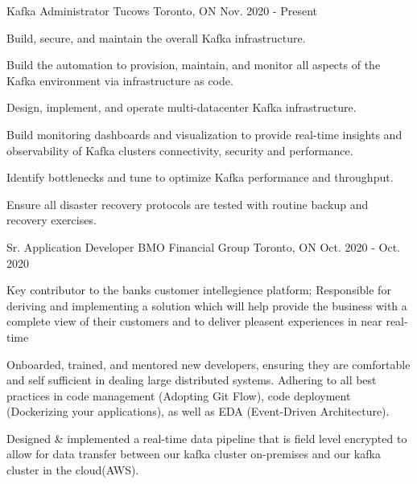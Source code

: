 


\begin{cventries}

\cventry
{Kafka Administrator} %
{Tucows} %
{Toronto, ON} %
{Nov. 2020 - Present} %
{ %
\begin{cvitems}
\item {Build, secure, and maintain the overall Kafka infrastructure.}
\item {Build the automation to provision, maintain, and monitor all aspects of the Kafka environment via infrastructure as code.}
\item {Design, implement, and operate multi-datacenter Kafka infrastructure.}
\item {Build monitoring dashboards and visualization to provide real-time insights and observability of Kafka clusters connectivity, security and performance.}
\item {Identify bottlenecks and tune to optimize Kafka performance and throughput.}
\item {Ensure all disaster recovery protocols are tested with routine backup and recovery exercises.}
\end{cvitems}
}


\cventry
{Sr. Application Developer} %
{BMO Financial Group} %
{Toronto, ON} %
{Oct. 2020 - Oct. 2020} %
{ %
\begin{cvitems}
\item {Key contributor to the banks customer intellegience platform; Responsible for deriving and implementing a solution which will help provide the business with a complete view of their customers and to deliver pleasent experiences in near real-time} 
\item {Onboarded, trained, and mentored new developers, ensuring they are comfortable and self sufficient in dealing large distributed systems. Adhering to all best practices in code management (Adopting Git Flow), code deployment (Dockerizing your applications), as well as EDA (Event-Driven Architecture).}
\item {Designed \& implemented a real-time data pipeline that is field level encrypted to allow for data transfer between our kafka cluster on-premises and our kafka cluster in the cloud(AWS).}
\end{cvitems}
}


\end{cventries}
